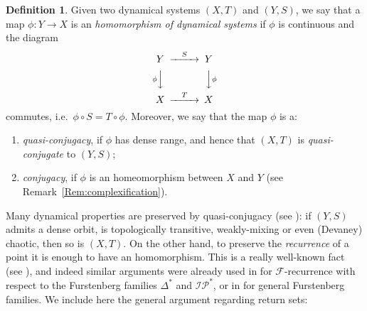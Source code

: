 \documentclass[openright,11pt]{article}
\theoremstyle{plain}
\theoremstyle{definition}
\newtheorem{definition}[theorem]{Definition}
\newcommand{\Del}{\Delta}
\newcommand{\Fc}{\mathcal{F}}
\newcommand{\IP}{\mathcal{IP}}
\begin{document}
\begin{definition}\label{Def:homeo.quasi-con.con}
	Given two dynamical systems $(X,T)$ and $(Y,S)$, we say that a map $\phi:Y\longrightarrow X$ is an {\em homomorphism of dynamical systems} if $\phi$ is continuous and the diagram 
	\begin{equation*}
		\begin{CD}
			Y  @>{S}>>  Y \\
			@V{\phi}VV  @VV{\phi}V \\
			X  @>{T}>>  X
		\end{CD}
	\end{equation*}
	commutes, i.e.\ $\phi\circ S = T\circ\phi$. Moreover, we say that the map $\phi$ is a:
	\begin{enumerate}[--]
		\item {\em quasi-conjugacy}, if $\phi$ has dense range, and hence that $(X,T)$ is {\em quasi-conjugate} to $(Y,S)$;
		
		\item {\em conjugacy}, if $\phi$ is an homeomorphism between $X$ and $Y$ (see Remark~\ref{Rem:complexification}).
	\end{enumerate}
\end{definition}

Many dynamical properties are preserved by quasi-conjugacy (see \cite[Chapter~1]{GrPe2011_book}): if $(Y,S)$ admits a dense orbit, is topologically transitive, weakly-mixing or even (Devaney) chaotic, then so is $(X,T)$. On the other hand, to preserve the {\em recurrence} of a point it is enough to have an homomorphism. This is a really well-known fact (see \cite[Proposition 1.3]{Furstenberg1981_book}), and indeed similar arguments were already used in \cite[Proposition 9.9]{Furstenberg1981_book} for $\Fc$-recurrence with respect to the Furstenberg families $\Del^*$ and $\IP^*$, or in \cite[Proposition~3.8]{CarMur2022_arXiv} for general Furstenberg families. We include here the general argument regarding return sets:
\end{document}

